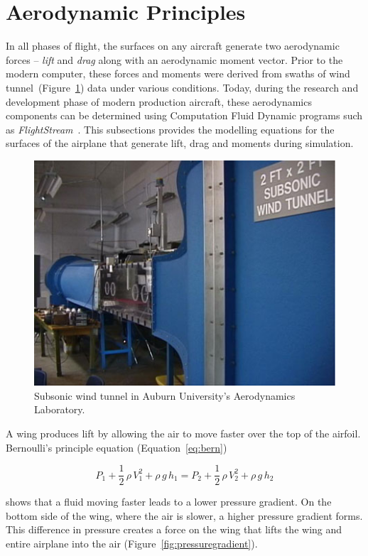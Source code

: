 \section{Aerodynamic Principles}\label{section:aerodynamic}
In all phases of flight, the surfaces on any aircraft generate two aerodynamic forces {--} \textit{lift} and \textit{drag} along with an aerodynamic moment vector. Prior to the modern computer, these forces and moments were derived from swaths of wind tunnel~(Figure~\ref{fig:windtunnel}) data under various conditions. Today, during the research and development phase of modern production aircraft, these aerodynamics components can be determined using Computation Fluid Dynamic programs such as \textit{FlightStream}~\cite{FlightStream}. This subsections provides the modelling equations for the surfaces of the airplane that generate lift, drag and moments during simulation.

\begin{figure}[!ht]\label{fig:windtunnel}
    \centering
    \includegraphics[width=.75\linewidth]{Figures/opencircuitwindtunnel.jpg}
    \caption{Subsonic wind tunnel in Auburn University's Aerodynamics Laboratory.}
\end{figure}


A wing produces lift by allowing the air to move faster over the top of the airfoil. Bernoulli's principle equation (Equation~\ref{eq:bern})

\begin{equation}\label{eq:bern}
    P_1 + \frac{1}{2}\, \rho \, V_1^2 + \rho \, g \, h_1 = P_2 + \frac{1}{2}\, \rho \, V_2^2 + \rho \, g \, h_2
\end{equation}

shows that a fluid moving faster leads to a lower pressure gradient. On the bottom side of the wing, where the air is slower, a higher pressure gradient forms. This difference in pressure creates a force on the wing that lifts the wing and entire airplane into the air (Figure~\ref{fig:pressuregradient}).

